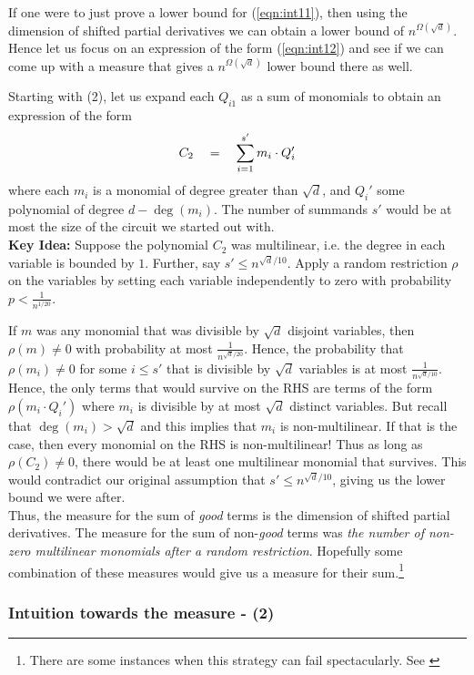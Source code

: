 \documentclass[12pt]{report}
\begin{document}
If one were to just prove a lower bound for (\ref{eqn:int11}), then using the dimension of shifted partial derivatives we can obtain a lower bound of $n^{\Omega(\sqrt{d})}$. Hence let us focus on an expression of the form (\ref{eqn:int12}) and see if we can come up with a measure that gives a $n^{\Omega(\sqrt{d})}$ lower bound there as well. 

Starting with (2), let us expand each $Q_{i1}$ as a sum of monomials to obtain an expression of the form
\[
C_2 \quad = \quad \sum_{i=1}^{s'} m_i\cdot  Q_i'
\]
where each $m_i$ is a monomial of degree greater than $\sqrt{d}$, and $Q_i'$ some polynomial of degree $d - \deg(m_i)$. The number of summands $s'$ would be at most the size of the circuit we started out with.\\

{\bf Key Idea:} Suppose the polynomial $C_2$ was multilinear, i.e. the degree in each variable is bounded by $1$.  Further, say $s' \leq n^{\sqrt{d}/10}$. Apply a random restriction $\rho$ on the variables by setting each variable independently to zero with probability $p < \frac{1}{n^{1/20}}$. 

If $m$ was any monomial that was divisible by $\sqrt{d}$ disjoint variables, then $\rho(m) \neq 0$ with probability at most $\frac{1}{n^{\sqrt{d}/20}}$. Hence, the probability that $\rho(m_i) \neq 0$ for some $i\leq s'$ that is divisible  by $\sqrt{d}$ variables is at most $\frac{1}{n^{\sqrt{d}/10}}$. Hence, the only terms that would survive on the RHS are terms of the form $\rho(m_i \cdot Q_i')$ where $m_i$ is divisible by at most $\sqrt{d}$ distinct variables. But recall that $\deg(m_i) > \sqrt{d}$ and this implies that $m_i$ is non-multilinear. If that is the case, then every monomial on the RHS is non-multilinear! Thus as long as $\rho(C_2) \neq 0$, there would be at least one multilinear monomial that survives. This would contradict our original assumption that $s' \leq n^{\sqrt{d}/10}$, giving us the lower bound we were after. \\

Thus, the measure for the sum of \emph{good} terms is the dimension of shifted partial derivatives. The measure for the sum of non-\emph{good} terms was \emph{the number of non-zero multilinear monomials after a random restriction}. Hopefully some combination of these measures would give us a measure for their sum.\footnote{There are some instances when this strategy can fail spectacularly. See \cite{KS14a}}

\subsubsection*{Intuition towards the measure - (2)}
\end{document}

